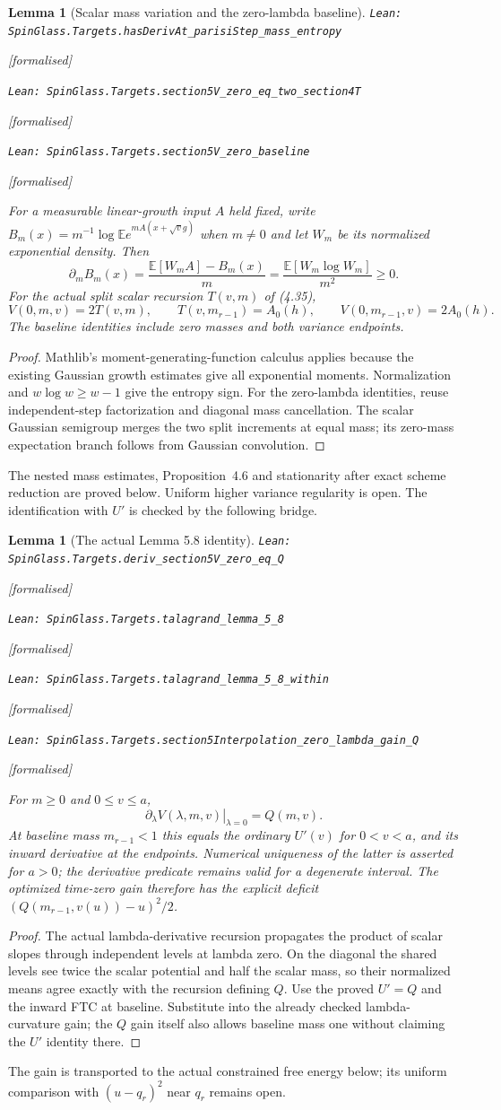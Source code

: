 \documentclass[11pt]{article}
\providecommand{\lean}[1]{\leavevmode\par\nopagebreak
  {\noindent\normalfont\footnotesize\raggedright\texttt{Lean: #1}\par}\nopagebreak}
\providecommand{\leanok}{\par\nopagebreak
  {\noindent\normalfont\footnotesize\textcolor{green!50!black}{[formalised]}\par}\nopagebreak}
\newtheorem{lemma}[theorem]{Lemma}
\begin{document}
\begin{lemma}[Scalar mass variation and the zero-lambda baseline]
\lean{SpinGlass.Targets.hasDerivAt\_parisiStep\_mass\_entropy}\leanok
\lean{SpinGlass.Targets.section5V\_zero\_eq\_two\_section4T}\leanok
\lean{SpinGlass.Targets.section5V\_zero\_baseline}\leanok
For a measurable linear-growth input $A$ held fixed, write
$B_m(x)=m^{-1}\log\mathbb E e^{mA(x+\sqrt v g)}$ when $m\ne0$
and let $W_m$ be its normalized exponential density. Then
\[
 \partial_m B_m(x)=\frac{\mathbb E[W_m A]-B_m(x)}m
 =\frac{\mathbb E[W_m\log W_m]}{m^2}\ge0.
\]
For the actual split scalar recursion $T(v,m)$ of (4.35),
\[
 V(0,m,v)=2T(v,m),\qquad T(v,m_{r-1})=A_0(h),\qquad
 V(0,m_{r-1},v)=2A_0(h).
\]
The baseline identities include zero masses and both variance endpoints.
\end{lemma}
\begin{proof}
Mathlib's moment-generating-function calculus applies because the existing
Gaussian growth estimates give all exponential moments. Normalization and
$w\log w\ge w-1$ give the entropy sign. For the zero-lambda identities,
reuse independent-step factorization and diagonal mass cancellation.
The scalar Gaussian semigroup merges the two split increments at equal
mass; its zero-mass expectation branch follows from Gaussian convolution.
\end{proof}
The nested mass estimates, Proposition~4.6 and stationarity after exact
scheme reduction are proved below. Uniform higher variance regularity is open.
The identification with $U'$ is checked by the following bridge.

\begin{lemma}[The actual Lemma 5.8 identity]
\lean{SpinGlass.Targets.deriv\_section5V\_zero\_eq\_Q}\leanok
\lean{SpinGlass.Targets.talagrand\_lemma\_5\_8}\leanok
\lean{SpinGlass.Targets.talagrand\_lemma\_5\_8\_within}\leanok
\lean{SpinGlass.Targets.section5Interpolation\_zero\_lambda\_gain\_Q}\leanok
For $m\ge0$ and $0\le v\le a$,
\[
 \left.\partial_\lambda V(\lambda,m,v)\right|_{\lambda=0}=Q(m,v).
\]
At baseline mass $m_{r-1}<1$ this equals the ordinary $U'(v)$ for
$0<v<a$, and its inward derivative at the endpoints. Numerical uniqueness
of the latter is asserted for $a>0$; the derivative predicate remains valid
for a degenerate interval. The optimized time-zero gain therefore has the
explicit deficit $(Q(m_{r-1},v(u))-u)^2/2$.
\end{lemma}
\begin{proof}
The actual lambda-derivative recursion propagates the product of scalar
slopes through independent levels at lambda zero. On the diagonal the
shared levels see twice the scalar potential and half the scalar mass,
so their normalized means agree exactly with the recursion defining $Q$.
Use the proved $U'=Q$ and the inward FTC at baseline. Substitute into
the already checked lambda-curvature gain; the $Q$ gain itself also allows
baseline mass one without claiming the $U'$ identity there.
\end{proof}
The gain is transported to the actual constrained free energy below; its
uniform comparison with $(u-q_r)^2$ near $q_r$ remains open.
\end{document}
